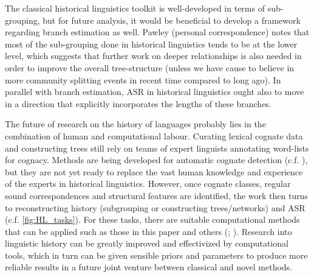 \documentclass[12pt,letterpaper]{article}
\begin{document}
The classical historical linguistics toolkit is well-developed in terms of sub-grouping, but for future analysis, it would be beneficial to develop a framework regarding branch estimation as well. Pawley (personal correspondence) notes that most of the sub-grouping done in historical linguistics tends to be at the lower level, which suggests that further work on deeper relationships is also needed in order to improve the overall tree-structure (unless we have cause to believe in more community splitting events in recent time compared to long ago). In parallel with branch estimation, ASR in historical linguistics ought also to move in a direction that explicitly incorporates the lengths of these branches. 



The future of research on the history of languages probably lies in the combination of human and computational labour. Curating lexical cognate data \citep{list2022lexibank} and constructing trees \citep{grayetal_2009} still rely on teams of expert linguists annotating word-lists for cognacy. Methods are being developed for automatic cognate detection (c.f. \citet{list2017potential}), but they are not yet ready to replace the vast human knowledge and experience of the experts in historical linguistics. However, once cognate classes, regular sound correspondences and structural features are identified, the work then turns to reconstructing history (subgrouping or constructing trees/networks) and ASR (c.f. \ref{fig:HL_tasks}). For these tasks, there are suitable computational methods that can be applied such as those in this paper and others (\citet{greenhill2015evolution}; \citet{gray_greenhill_defend_bayes}). Research into linguistic history can be greatly improved and effectivized by computational tools, which in turn can be given sensible priors and parameters to produce more reliable results in a future joint venture between classical and novel methods.
\end{document}

